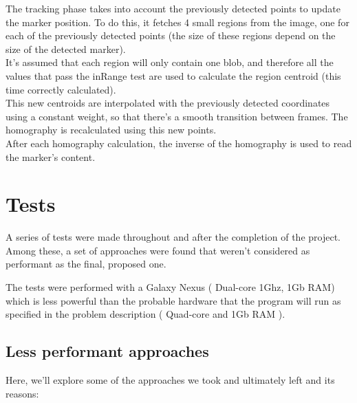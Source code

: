 \documentclass[DIV=calc, paper=a4, fontsize=11pt, twocolumn]{scrartcl}   %
\begin{document}
The tracking phase takes into account the previously detected points to update the marker position. To do this, it fetches 4 small regions from the image, one for each of the previously detected points (the size of these regions depend on the size of the detected marker).\\


It's assumed that each region will only contain one blob, and therefore all the values that pass the inRange test are used to calculate the region centroid (this time correctly calculated).\\


This new centroids are interpolated with the previously detected coordinates using a constant weight, so that there's a smooth transition between frames. The homography is recalculated using this new points.\\


After each homography calculation, the inverse of the homography is used to read the marker's content.\\


\section*{Tests}

A series of tests were made throughout and after the completion of the project. Among these, a set of approaches were found that weren't considered as performant as the final, proposed one.

The tests were performed with a Galaxy Nexus ( Dual-core 1Ghz, 1Gb RAM) which is less powerful than the probable hardware that the program will run as specified in the problem description ( Quad-core and 1Gb RAM ).

\subsection*{Less performant approaches}
Here, we'll explore some of the approaches we took and ultimately left and its reasons:
\end{document}
